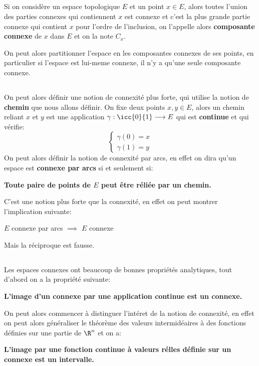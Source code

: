 \subsection*{}
Si on considère un espace topologique \(E\) et un point \(x \in E\), alors toutes l'union des parties connexes qui contiennent \(x\) est connexe et c'est la plus grande partie connexe qui contient \(x\) pour l'ordre de l'inclusion, on l'appelle alors \textbf{composante connexe} de \(x\) dans \(E\) et on la note \(C_x\).\<

On peut alors partitionner l'espace en les composantes connexes de ses points, en particulier si l'espace est lui-meme connexe, il n'y a qu'une seule composante connexe.

\subsection*{}
On peut alors définir une notion de connexité plus forte, qui utilise la notion de \textbf{chemin} que nous allons définir. On fixe deux points \(x, y \in E\), alors un chemin reliant \(x\) et \(y\) est une application \(\gamma: \icc{0}{1} \longrightarrow E\) qui est \textbf{continue} et qui vérifie:
\[
   \begin{cases}
      \gamma(0) = x \\
      \gamma(1) = y
   \end{cases}
\]
On peut alors définir la notion de connexité par arcs, en effet on dira qu'un espace est \textbf{connexe par arcs} si et seulement si:
\begin{center}
   \textbf{Toute paire de points de \(E\) peut être réliée par un chemin.}
\end{center}
C'est une notion plus forte que la connexité, en effet on peut montrer l'implication suivante:
\begin{center}
   \(E\) connexe par arcs \(\implies\) \(E\) connexe
\end{center}
Mais la réciproque est fausse.

\subsection*{}
Les espaces connexes ont beaucoup de bonnes propriétés analytiques, tout d'abord on a la propriété suivante:
\begin{center}
   \textbf{L'image d'un connexe par une application continue est un connexe.}
\end{center}
On peut alors commencer à distinguer l'intéret de la notion de connexité, en effet on peut alors généraliser le théorème des valeurs intermidéaires à des fonctions définies sur une partie de \(\R^n\) et on a:
\begin{center}
   \textbf{L'image par une fonction continue à valeurs rélles définie sur un connexe est un intervalle.}
\end{center}
